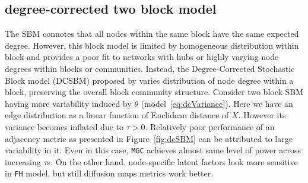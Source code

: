 \documentclass[12pt]{article}
\theoremstyle{definition}
\begin{document}
\subsection{degree-corrected two block model}

The SBM connotes that all nodes within the same block have the same expected degree. However, this block model is limited by homogeneous distribution within block and provides a poor fit to networks with hubs or highly varying node degrees within blocks or communities. Instead, the Degree-Corrected Stochastic Block model (DCSBM) proposed by \cite{karrer2011stochastic} varies distribution of node degree within a block, preserving the overall block community structure. Consider two block SBM having more variability induced by $\theta$ (model~\ref{eq:dcVariance}). Here we have an edge distribution as a linear function of Euclidean distance of $X$. However its variance becomes inflated due to $\tau > 0$. Relatively poor performance of an adjacency metric as presented in Figure~\ref{fig:dcSBM} can be attributed to large variability in it. Even in this case, \texttt{MGC} achieves almost same level of power across increasing $\tau$s. On the other hand, node-specific latent factors look more sensitive in \texttt{FH} model, but still diffusion maps metrics work better.
\end{document}
